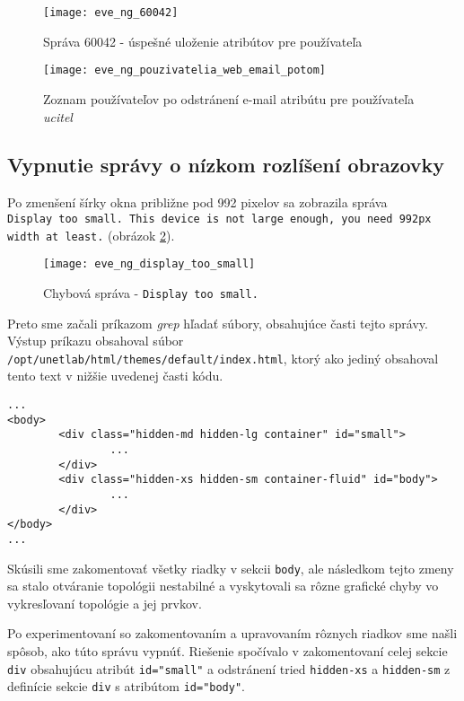 \begin{figure}
    \centering
    \texttt{[image: eve\_ng\_60042]}
    \caption{Správa 60042 - úspešné uloženie atribútov pre používateľa}
    \label{obr:eve_ng_60042}
    
    \centering
    \texttt{[image: eve\_ng\_pouzivatelia\_web\_email\_potom]}
    \caption{Zoznam používateľov po odstránení e-mail atribútu pre používateľa \emph{ucitel}}
    \label{obr:eve_ng_pouzivatelia_web_email_potom}
\end{figure}






\subsection{Vypnutie správy o nízkom rozlíšení obrazovky}

Po zmenšení šírky okna približne pod 992 pixelov sa zobrazila správa \\
\texttt{Display too small. This device is not large enough, you need 992px width at least.} (obrázok \ref{obr:eve_ng_display_too_small}).

\begin{figure}
    \centering
    \texttt{[image: eve\_ng\_display\_too\_small]}
    \caption{Chybová správa - \texttt{Display too small.}}
    \label{obr:eve_ng_display_too_small}
\end{figure}

Preto sme začali príkazom \emph{grep} hľadať súbory, obsahujúce časti tejto správy. Výstup príkazu obsahoval súbor  \texttt{/opt/unetlab/html/themes/default/index.html}, ktorý ako jediný obsahoval tento text v nižšie uvedenej časti kódu.

\begin{Verbatim}[samepage=true]
...
<body>
        <div class="hidden-md hidden-lg container" id="small">
                ...
        </div>
        <div class="hidden-xs hidden-sm container-fluid" id="body">
                ...
        </div>
</body>
...
\end{Verbatim}

Skúsili sme zakomentovať všetky riadky v sekcii \texttt{body}, ale následkom tejto zmeny sa stalo otváranie topológii nestabilné a vyskytovali sa rôzne grafické chyby vo vykresľovaní topológie a jej prvkov.

Po experimentovaní so zakomentovaním a upravovaním rôznych riadkov sme našli spôsob, ako túto správu vypnúť. Riešenie spočívalo v zakomentovaní celej sekcie \texttt{div} obsahujúcu atribút \texttt{id="small"} a odstránení tried \texttt{hidden-xs} a \texttt{hidden-sm} z definície sekcie \texttt{div} s atribútom \texttt{id="body"}.

